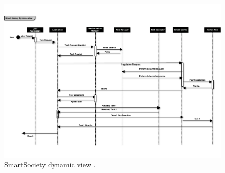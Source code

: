 \begin{figure}[!hbt]
 \centering
 \includegraphics[width=1\textwidth]{figs/dynamic_view.pdf}
 \caption{SmartSociety dynamic view .}
 \label{fig:dynamic_view}
\end{figure}


